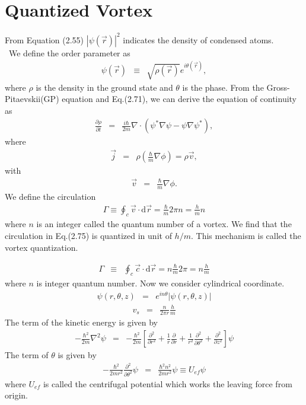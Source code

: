 \documentclass[12pt,a4paper]{jbook}
\newcommand{\diff}{\mathrm{d}}				           %
\begin{document}
\section{Quantized Vortex}
From Equation (2.55) $|\psi(\vec{r})|^2$ indicates the density of condensed atoms.
\\
\ We define the order parameter as
\begin{eqnarray}
\psi( \vec{r} ) & \equiv & \sqrt{\rho(\vec{r})} e^{i \theta(\vec{r})},
\end{eqnarray}
where $\rho$ is the density in the ground state and $\theta$ is the phase.
From the Gross-Pitaevskii(GP) equation and Eq.(2.71), we can derive the equation of continuity as
\begin{eqnarray}
\frac{\partial \rho}{\partial t} & = & \frac{i \hbar}{2m} \nabla \cdot ( \psi^* \nabla \psi - \psi \nabla \psi^* ),
\end{eqnarray}
where
\begin{eqnarray}
\vec{j} & = &  \rho \left( \frac{\hbar}{m} \nabla \phi \right) = \rho \vec{v},
\end{eqnarray}
with
\begin{eqnarray}
\vec{v} & = & \frac{\hbar}{m} \nabla \phi.
\end{eqnarray}
We define the circulation
\begin{eqnarray}
\Gamma \equiv \oint_c \vec{v} \cdot \diff \vec{r} = \frac{\hbar}{m} 2 \pi n = \frac{h}{m} n
\end{eqnarray}
where $n$ is an integer called the  quantum number of a vortex.
We find that the circulation in Eq.(2.75) is quantized in unit of $h/m$.
This mechanism is called the vortex quantization.

\begin{eqnarray}
\Gamma & \equiv & \oint_c \vec{c} \cdot \diff \vec{r} = n \frac{\hbar}{m} 2 \pi = n \frac{h}{m}
\end{eqnarray}
where $n$ is integer quantum number.
Now we consider cylindrical coordinate.
\begin{eqnarray}
\psi(r, \theta, z) & = & e^{i n \theta}|\psi(r, \theta, z)|
\end{eqnarray}
\begin{eqnarray}
v_s & = & \frac{n}{2 \pi r}\frac{h}{m}
\end{eqnarray}
The term of the kinetic energy is given by
\begin{eqnarray}
- \frac{\hbar^2}{2m} \nabla^2 \psi & = & -\frac{\hbar^2}{2m}
\left[ \frac{\partial^2}{\partial r^2} + \frac{1}{r} \frac{\partial}{\partial r}
+ \frac{1}{r^2}\frac{\partial^2}{\partial \theta^2} + \frac{\partial^2}{\partial z^2}
\right] \psi
\end{eqnarray}
The term of $\theta$ is given by
\begin{eqnarray}
-\frac{\hbar^2}{2mr^2} \frac{\partial^2}{\partial \theta^2} \psi
& = & \frac{\hbar^2 n^2}{2mr^2} \psi \equiv U_{ef} \psi
\end{eqnarray}
where $U_{ef}$ is called the centrifugal potential which works the leaving force from origin.
\end{document}
